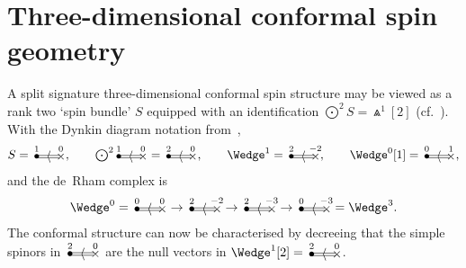 \documentclass[10pt,a4paper]{amsart}
\numberwithin{equation}{section}
\newcommand{\btwo}[2]{\begin{picture}(28,11)
\put(4,1.5){\makebox(0,0){$\bullet$}}
\put(24,1.5){\makebox(0,0){$\times$}}
\put(23,2.5){\line(-1,0){20}}
\put(23,0.5){\line(-1,0){20}}
\put(14,1.5){\makebox(0,0){$\langle$}}
\put(4,8){\makebox(0,0){$\scriptstyle #1$}}
\put(24,8){\makebox(0,0){$\scriptstyle #2$}}
\end{picture}}
\begin{document}
\section{Three-dimensional conformal spin geometry}\label{3d_conformal}
A split signature three-dimensional conformal spin structure may be viewed as a
rank two `spin bundle' $S$ equipped with an identification
$\bigodot^2\!S=\Wedge^1[2]$ (cf.~\cite{S}). With the Dynkin diagram notation
from~\cite{BE},
\[\textstyle S=\btwo{1}{0},\qquad \bigodot^2\!\btwo{1}{0}=\btwo{2}{0},\qquad
\Wedge^1=\btwo{2}{-2},\qquad\Wedge^0[1]=\btwo{0}{1},\]
and the de~Rham complex is
\[\Wedge^0=\btwo{0}{0}\to\btwo{2}{-2}\to\btwo{2}{-3}\to\btwo{0}{-3}
=\Wedge^3.\]
The conformal structure can now be characterised by decreeing that the simple
spinors in $\btwo{2}{0}$ are the null vectors in $\Wedge^1[2]=\btwo{2}{0}$.
\end{document}
